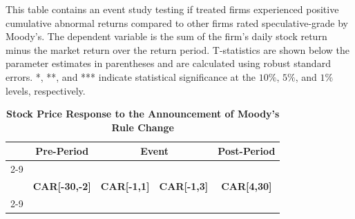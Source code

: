 \documentclass[a4paper, 12pt]{article}
\begin{document}
\begin{landscape}
\pagestyle{empty}
\begin{table}[htbp]
\caption{\textbf{Stock Price Response to the Announcement of Moody's Rule Change}
} \label{table_carun}
\begin{singlespace}
\begin{small}

\noindent This table contains an event study testing if treated firms experienced positive cumulative abnormal returns compared to other firms rated speculative-grade by Moody's. The dependent variable is the sum of the firm's daily stock return minus the market return over the return period. T-statistics are shown below the parameter estimates in parentheses and are calculated using robust standard errors. *, **, and *** indicate statistical significance at the $10\%$, $5\%$, and $1\%$ levels, respectively.

\end{small}
\end{singlespace}
\vspace{3mm}
\small
  \centering

\begin{tabular}{lcccccccc}
\\
    \toprule
    &
        \multicolumn{2}{c}{\textbf{Pre-Period}} &
      \multicolumn{4}{c}{\textbf{Event}} &
        \multicolumn{2}{c}{\textbf{Post-Period}}
        \\
                  \cline{2-9}
        \\
    &
    \multicolumn{2}{c}{\textbf{CAR[-30,-2]}} &
      \multicolumn{2}{c}{\textbf{CAR[-1,1]}} &
        \multicolumn{2}{c}{\textbf{CAR[-1,3]}} &
           \multicolumn{2}{c}{\textbf{CAR[4,30]}}
      \\
          \cline{2-9}

    \bottomrule
    \end{tabular}


\end{table}
\end{landscape}
\clearpage
\end{document}
